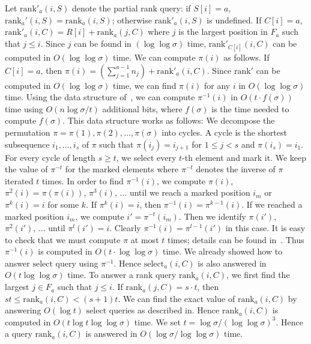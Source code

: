 \documentclass[11pt]{article}\usepackage{fullpage}
\def\idrm#1{\ensuremath{\mathrm{#1}}}
\newcommand{\ra}{\idrm{rank}}
\newcommand{\sel}{\idrm{select}}
\begin{document}
Let $\ra'_a(i,S)$ denote the partial rank query: if $S[i]=a$, $\ra_a'(i,S)=\ra_a(i,S)$; otherwise $\ra'_a(i,S)$ is undefined. If $C[i]=a$, $\ra'_a(i,C)=R[i]+\ra_a(j,C)$ where $j$ is the largest position in $F_a$ such that $j\le i$. Since $j$ can be found in $(\log\log\sigma)$ time, $\ra'_{C[i]}(i,C)$ can be computed in $O(\log\log\sigma)$ time.
We can compute $\pi(i)$ as follows. If $C[i]=a$, then $\pi(i)=(\sum_{j=1}^{a-1}n_j) + \ra'_a(i,C)$. Since $\ra'$ can be computed in $O(\log\log \sigma)$ time, we can find $\pi(i)$ for any $i$ in $O(\log\log \sigma)$ time. 
Using the data structure of~\cite{MunroRRR12}, we can compute $\pi^{-1}(i)$ in $O(t\cdot f(\sigma))$ time using $O(n\log\sigma/t)$ additional bits, where $f(\sigma)$ is the time needed to compute $f(\sigma)$. This data structure works as follows:
We decompose the permutation $\pi=\pi(1),\pi(2),\ldots, \pi(\sigma)$ into cycles. A cycle is the shortest subsequence $i_1,\ldots ,i_s$ of $\pi$ such that $\pi(i_j)=i_{j+1}$ for $1\le j< s$ and $\pi(i_s)=i_1$. For every cycle of length $s\ge t$, we select every $t$-th element and mark it. We keep the value of $\pi^{-t}$ for the marked elements where $\pi^{-t}$ denotes the inverse of $\pi$ iterated $t$ times. In order to find $\pi^{-1}(i)$, we compute $\pi(i)$, $\pi^2(i)=\pi(\pi(i))$, $\pi^3(i)$, $\ldots$ until we reach a marked position $i_m$ or $\pi^{k}(i)=i$ for some $k$. If $\pi^{k}(i)=i$, then $\pi^{-1}(i)=\pi^{k-1}(i)$. If we reached a marked position $i_m$, we compute $i'=\pi^{-t}(i_m)$. Then we identify $\pi(i')$, $\pi^2(i')$, $\ldots$ until $\pi^l(i')=i$. Clearly $\pi^{-1}(i)=\pi^{l-1}(i')$ in this case. It is easy to check that we must compute $\pi$ at most $t$ times; details can be found in~\cite{MunroRRR12}.  
Thus $\pi^{-1}(i)$ is computed in $O(t\cdot \log\log \sigma)$ time. We already showed how to answer $\sel$ query using $\pi^{-1}$. Hence $\sel_a(i,C)$ is also answered in $O(t\log\log\sigma)$ time. To answer a rank query $\ra_a(i,C)$, we first find the largest $j\in F_a$ such that $j\le i$. If $\ra_a(j,C)=s\cdot t$, then $st\le \ra_a(i,C) < (s+1)t$. We can find the exact value of $\ra_a(i,C)$ by answering $O(\log t)$ $\sel$ queries as described in\cite{GMR06,BHMR07}. Hence $\ra_a(i,C)$ is computed in $O(t\log t \log\log \sigma)$ time.  We set $t=\log \sigma/(\log \log \sigma)^3$. Hence a query $\ra_a(i,C)$ is answered in $O(\log\sigma/\log\log\sigma)$ time. 
\end{document}

